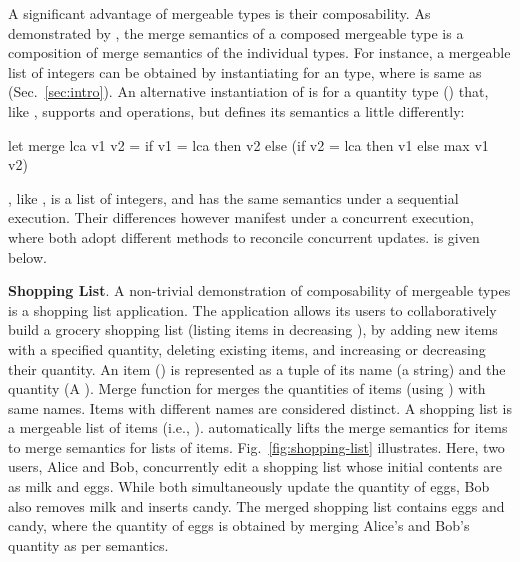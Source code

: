 A significant advantage of mergeable types is their composability. As
demonstrated by , the merge semantics of a composed mergeable
type is a composition of merge semantics of the individual types.  For
instance, a mergeable list of integers can be obtained by
instantiating  for an  type, where  is
same as  (Sec.~\ref{sec:intro}). 
An alternative instantiation of  is for a quantity type
() that, like , supports  and 
operations, but defines its  semantics a little differently:
\begin{ocaml}
let merge lca v1 v2 = if v1 = lca then v2 else (if v2 = lca then v1 else max v1 v2)
\end{ocaml}
, like , is a list of integers, and has
the same semantics under a sequential execution. Their differences
however manifest under a concurrent execution, where both adopt
different methods to reconcile concurrent updates.  is given
below.



{\bf Shopping List}. A non-trivial demonstration of composability of
mergeable types is a shopping list application. The application
allows its users to collaboratively build a grocery shopping
list (listing items in decreasing ), by adding new items with a
specified quantity, deleting existing items, and increasing or
decreasing their quantity. An item () is represented as a
tuple of its name (a string) and the quantity (A ). Merge
function for  merges the quantities of items (using
) with same names. Items with different names are
considered distinct. A shopping list is a mergeable list of items
(i.e., ).  automatically lifts the
merge semantics for items to merge semantics for lists of items.
Fig.~\ref{fig:shopping-list} illustrates. Here, two users, Alice and
Bob, concurrently edit a shopping list whose initial contents are
as milk and eggs. While both simultaneously update the quantity of
eggs, Bob also removes milk and inserts candy. The merged shopping
list contains eggs and candy, where the quantity of eggs is obtained
by merging Alice's and Bob's quantity as per  semantics.

